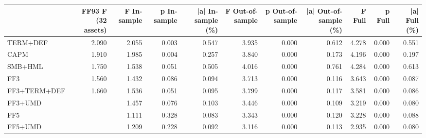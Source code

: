 \begin{tabular}{lrrrrrrrrrr}
\toprule
 & FF93 F (32 assets) & F In-sample & p In-sample & |a| In-sample (\%) & F Out-of-sample & p Out-of-sample & |a| Out-of-sample (\%) & F Full & p Full & |a| Full (\%) \\
\midrule
TERM+DEF & 2.090 & 2.055 & 0.003 & 0.547 & 3.935 & 0.000 & 0.612 & 4.278 & 0.000 & 0.551 \\
CAPM & 1.910 & 1.985 & 0.004 & 0.257 & 3.840 & 0.000 & 0.173 & 4.196 & 0.000 & 0.197 \\
SMB+HML & 1.750 & 1.538 & 0.051 & 0.505 & 4.016 & 0.000 & 0.761 & 4.284 & 0.000 & 0.613 \\
FF3 & 1.560 & 1.432 & 0.086 & 0.094 & 3.713 & 0.000 & 0.116 & 3.643 & 0.000 & 0.087 \\
FF3+TERM+DEF & 1.660 & 1.536 & 0.051 & 0.095 & 3.799 & 0.000 & 0.117 & 3.581 & 0.000 & 0.086 \\
FF3+UMD &  & 1.457 & 0.076 & 0.103 & 3.446 & 0.000 & 0.109 & 3.219 & 0.000 & 0.080 \\
FF5 &  & 1.111 & 0.328 & 0.083 & 3.343 & 0.000 & 0.120 & 3.228 & 0.000 & 0.088 \\
FF5+UMD &  & 1.209 & 0.228 & 0.092 & 3.116 & 0.000 & 0.113 & 2.935 & 0.000 & 0.080 \\
\bottomrule
\end{tabular}
